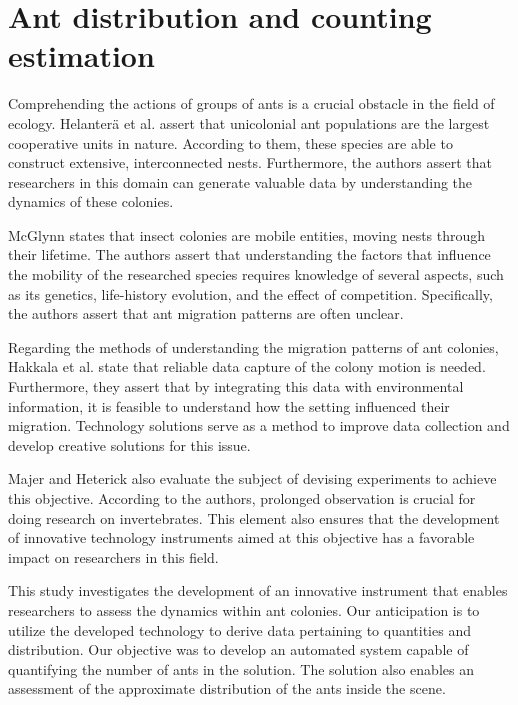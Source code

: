 \section{Ant distribution and counting estimation}

Comprehending the actions of groups of ants is a crucial obstacle in the field of ecology. Helanterä et al. \cite{helantera2009unicolonial} assert that unicolonial ant populations are the largest cooperative units in nature. According to them, these species are able to construct extensive, interconnected nests. Furthermore, the authors assert that researchers in this domain can generate valuable data by understanding the dynamics of these colonies.

McGlynn \cite{mcglynn2012ecology} states that insect colonies are mobile entities, moving nests through their lifetime. The authors assert that understanding the factors that influence the mobility of the researched species requires knowledge of several aspects, such as its genetics, life-history evolution, and the effect of competition. Specifically, the authors assert that ant migration patterns are often unclear.

Regarding the methods of understanding the migration patterns of ant colonies, Hakkala et al. \cite{hakala2019evolution} state that reliable data capture of the colony motion is needed. Furthermore, they assert that by integrating this data with environmental information, it is feasible to understand how the setting influenced their migration. Technology solutions serve as a method to improve data collection and develop creative solutions for this issue.

Majer and Heterick \cite{majer2018planning} also evaluate the subject of devising experiments to achieve this objective. According to the authors, prolonged observation is crucial for doing research on invertebrates. This element also ensures that the development of innovative technology instruments aimed at this objective has a favorable impact on researchers in this field.

This study investigates the development of an innovative instrument that enables researchers to assess the dynamics within ant colonies. Our anticipation is to utilize the developed technology to derive data pertaining to quantities and distribution. Our objective was to develop an automated system capable of quantifying the number of ants in the solution. The solution also enables an assessment of the approximate distribution of the ants inside the scene.

